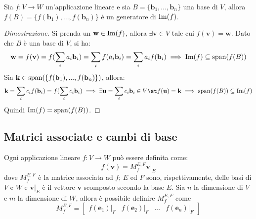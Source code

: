     \vspace{10pt}
    \begin{theorem} \label{thm:image_of_basis}
        Sia $f : V \rightarrow W$ un'applicazione lineare e sia $B = \{\mathbf{b}_{1}, ..., \mathbf{b}_{n}\}$ una base di $V$, allora $f(B) = \{f(\mathbf{b}_{1}), ..., f(\mathbf{b}_{n})\}$ è un generatore di $\textnormal{Im}(f)$.
    \end{theorem}

    \begin{proof}[Dimostrazione]
        Si prenda un $\mathbf{w} \in \textnormal{Im}(f)$, allora $\exists \mathbf{v} \in V$ tale cui $f(\mathbf{v}) = \mathbf{w}$. Dato che $B$ è una base di $V$, si ha:
        \[
            \mathbf{w} = f(\mathbf{v}) = f(\sum_{i} a_i \mathbf{b}_{i}) = \sum_{i} f(a_i \mathbf{b}_{i}) = \sum_{i} a_i f(\mathbf{b}_{i}) \implies \textnormal{Im}(f) \subseteq \textnormal{span}(f(B))
        \]
        Sia $\mathbf{k} \in \textnormal{span}(\{f(\mathbf{b}_{1}), ..., f(\mathbf{b}_{n})\})$, allora:
        \[
            \mathbf{k} = \sum_{i} c_i f(\mathbf{b}_{i}) = f(\sum_{i} c_i \mathbf{b}_{i}) \implies \exists \mathbf{u} = \sum_{i} c_i \mathbf{b}_{i} \in V \st f(\mathbf{u}) = \mathbf{k} \implies \textnormal{span}(f(B)) \subseteq \textnormal{Im}(f)
        \]
        Quindi $\textnormal{Im}(f) = \textnormal{span}(f(B))$.
    \end{proof}



\vspace{10pt}
\subsection{Matrici associate e cambi di base} \label{subsec:linappmat}
    Ogni applicazione lineare $f: V \rightarrow W$ può essere definita come:
    \[
        f(\mathbf{v}) = M_{f}^{E, F}\mathbf{v}\rvert_{E}
    \]
    dove $M_{f}^{E, F}$ è la matrice associata ad $f$; $E$ ed $F$ sono, rispettivamente, delle basi di $V$ e $W$ e $\mathbf{v}\rvert_{E}$ è il vettore $\mathbf{v}$ scomposto secondo la base $E$.
    Sia $n$ la dimensione di $V$ e $m$ la dimensione di $W$, allora è possibile definire $M_{f}^{E, F}$ come
    \[
        M_{f}^{E, F} = \begin{bmatrix} f(\mathbf{e}_{1})\rvert_{F} & f(\mathbf{e}_{2})\rvert_{F} & ... & f(\mathbf{e}_{n})\rvert_{F} \end{bmatrix}
    \]

